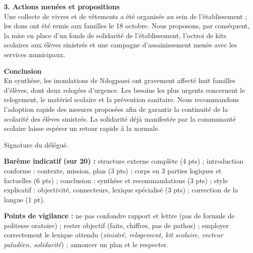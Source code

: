 \documentclass[11pt]{article}
\begin{document}
\begin{corrige}
\textbf{3. Actions menées et propositions}\\
Une collecte de vivres et de vêtements a été organisée au sein de l'établissement ; les dons ont été remis aux familles le 18 octobre. Nous proposons, par conséquent, la mise en place d'un fonds de solidarité de l'établissement, l'octroi de kits scolaires aux élèves sinistrés et une campagne d'assainissement menée avec les services municipaux.

\textbf{Conclusion}\\
En synthèse, les inondations de Ndogpassi ont gravement affecté huit familles d'élèves, dont deux relogées d'urgence. Les besoins les plus urgents concernent le relogement, le matériel scolaire et la prévention sanitaire. Nous recommandons l'adoption rapide des mesures proposées afin de garantir la continuité de la scolarité des élèves sinistrés. La solidarité déjà manifestée par la communauté scolaire laisse espérer un retour rapide à la normale.

Signature du délégué.

\textbf{Barème indicatif (sur 20) :} structure externe complète (4 pts) ; introduction conforme : contexte, mission, plan (3 pts) ; corps en 3 parties logiques et factuelles (6 pts) ; conclusion : synthèse et recommandations (3 pts) ; style explicatif : objectivité, connecteurs, lexique spécialisé (3 pts) ; correction de la langue (1 pt).

\textbf{Points de vigilance :} ne pas confondre rapport et lettre (pas de formule de politesse oratoire) ; rester objectif (faits, chiffres, pas de pathos) ; employer correctement le lexique attendu (\emph{sinistré, relogement, kit scolaire, vecteur paludéen, solidarité}) ; annoncer un plan et le respecter.
\end{corrige}
\end{document}
